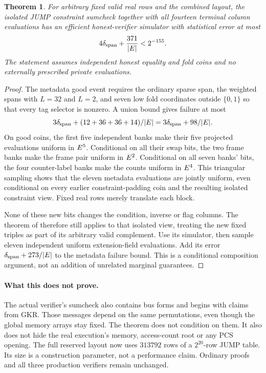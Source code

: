 \documentclass[11pt]{article}
\newtheorem{theorem}[lemma]{Theorem}
\begin{document}
\begin{theorem}\label{thm:jump-metadata}
For arbitrary fixed valid real rows and the combined layout, the isolated JUMP constraint sumcheck together with all fourteen terminal column evaluations has an efficient honest-verifier simulator with statistical error at most
\[
 4\delta_{\mathrm{span}}+\frac{371}{|E|}<2^{-155}.
\]
The statement assumes independent honest equality and fold coins and no externally prescribed private evaluations.
\end{theorem}
\begin{proof}
The metadata good event requires the ordinary sparse span, the weighted spans with $L=32$ and $L=2$, and seven low fold coordinates outside $\{0,1\}$ so that every tag selector is nonzero. A union bound gives failure at most
\[
 3\delta_{\mathrm{span}}+(12+36+36+14)/|E|
 =3\delta_{\mathrm{span}}+98/|E|.
\]
On good coins, the first five independent banks make their five projected evaluations uniform in $E^5$. Conditional on all their swap bits, the two frame banks make the frame pair uniform in $E^2$. Conditional on all seven banks' bits, the four counter-label banks make the counts uniform in $E^4$. This triangular sampling shows that the eleven metadata evaluations are jointly uniform, even conditional on every earlier constraint-padding coin and the resulting isolated constraint view. Fixed real rows merely translate each block.

None of these new bits changes the condition, inverse or flag columns. The theorem of  therefore still applies to that isolated view, treating the new fixed triples as part of its arbitrary valid complement. Use its simulator, then sample eleven independent uniform extension-field evaluations. Add its error $\delta_{\mathrm{span}}+273/|E|$ to the metadata failure bound. This is a conditional composition argument, not an addition of unrelated marginal guarantees.
\end{proof}

\paragraph{What this does not prove.} The actual verifier's sumcheck also contains bus forms and begins with claims from GKR. Those messages depend on the same permutations, even though the global memory arrays stay fixed. The theorem does not condition on them. It also does not hide the real execution's memory, access-count root or any PCS opening. The full reserved layout now uses $313792$ rows of a $2^{20}$-row JUMP table. Its size is a construction parameter, not a performance claim. Ordinary proofs and all three production verifiers remain unchanged.
\end{document}

